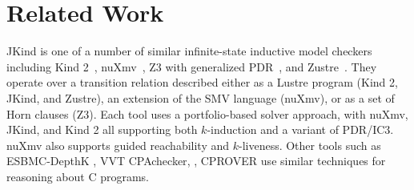 \documentclass{llncs}
\newcommand{\jkind}{{\sc JKind}\xspace}
\newcommand{\kind}{{\sc Kind}\xspace}
\newcommand{\lustre}{{\sc Lustre}\xspace}
\newcommand{\gryphon}{{\sc Gryphon}\xspace}
\newcommand{\nuxmv}{{\sc nuXmv}\xspace}
\newcommand{\zustre}{{\sc Zustre}\xspace}
\newcommand{\zthree}{{\sc Z3}\xspace}
\renewcommand{\paragraph}[1]{\vspace{5pt}\noindent {\bf #1}}
\newcommand{\application}[2]{
  \paragraph{#1} \hfill {\it #2}
  \vspace{1pt}
}
\begin{document}



\section{Related Work}
\jkind is one of a number of similar infinite-state inductive model
checkers including {\sc Kind 2}~\cite{champion2016cav},
\nuxmv~\cite{cimatti2014tacas}, \zthree with generalized
PDR~\cite{GPDR}, and \zustre~\cite{Zustre}. They operate over a
transition relation described either as a \lustre program (\kind 2,
\jkind, and \zustre), an extension of the SMV language (\nuxmv), or as
a set of Horn clauses (\zthree).  Each tool uses a portfolio-based
solver approach, with \nuxmv, \jkind, and \kind 2 all
supporting both $k$-induction and a variant of PDR/IC3.  \nuxmv also
supports guided reachability and $k$-liveness.  Other tools such as
{\sc ESBMC-DepthK} \cite{rocha2017model}, {\sc VVT}
\cite{beyer2016smt} {\sc CPAchecker}, \cite{beyer2015boosting}, {\sc
  CPROVER} \cite{brain2015safety} use similar techniques for
reasoning about C programs.
\end{document}
